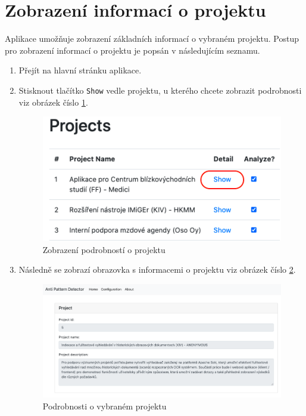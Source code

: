 \documentclass[czech,DP]{thesiskiv}
\begin{document}
\section{Zobrazení informací o projektu}
Aplikace umožňuje zobrazení základních informací o vybraném projektu. Postup pro zobrazení informací o projektu je popsán v následujícím seznamu.
\begin{enumerate}
    \item Přejít na hlavní stránku aplikace.
    \item Stisknout tlačítko \texttt{Show} vedle projektu, u kterého chcete zobrazit podrobnosti viz obrázek číslo \ref{img:user_screen_6}.
\begin{figure}[!htb]
    \centering
    \includegraphics[width=300pt]{img/user_screen_6.png}
    \caption{Zobrazení podrobností o projektu}
    \label{img:user_screen_6}
\end{figure}
\FloatBarrier
    \item Následně se zobrazí obrazovka s informacemi o projektu viz obrázek číslo \ref{img:user_screen_7}.
\begin{figure}[!htb]
    \centering
    \includegraphics[width=400pt]{img/user_screen_7.png}
    \caption{Podrobnosti o vybraném projektu}    
    \label{img:user_screen_7}
\end{figure}
\FloatBarrier
\end{enumerate}
\end{document}
